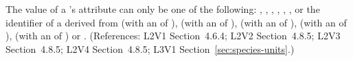 The value of a \Species's  attribute can only be one of
the following: , , , ,
, ,  or the identifier of a
\UnitDefinition derived from  (with an  of
),  (with an  of ), 
(with an  of ),  (with an
 of ),  (with an 
of ) or .  (References: L2V1
Section~4.6.4; L2V2 Section~4.8.5; L2V3 Section~4.8.5; L2V4 Section~4.8.5; 
L3V1 Section~\ref{sec:species-units}.)
